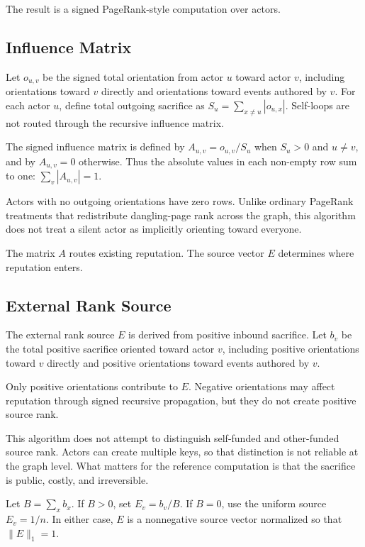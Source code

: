 \documentclass[11pt]{article}
\begin{document}
The result is a signed PageRank-style computation over actors.

\subsection{Influence Matrix}

Let \(o_{u,v}\) be the signed total orientation from actor \(u\) toward actor \(v\), including orientations toward \(v\) directly and orientations toward events authored by \(v\). For each actor \(u\), define total outgoing sacrifice as \(S_u = \sum_{x \ne u} |o_{u,x}|\). Self-loops are not routed through the recursive influence matrix.

The signed influence matrix is defined by \(A_{u,v} = o_{u,v}/S_u\) when \(S_u > 0\) and \(u \ne v\), and by \(A_{u,v}=0\) otherwise. Thus the absolute values in each non-empty row sum to one: \(\sum_v |A_{u,v}| = 1\).

Actors with no outgoing orientations have zero rows. Unlike ordinary PageRank treatments that redistribute dangling-page rank across the graph, this algorithm does not treat a silent actor as implicitly orienting toward everyone.

The matrix \(A\) routes existing reputation. The source vector \(E\) determines where reputation enters.

\subsection{External Rank Source}

The external rank source \(E\) is derived from positive inbound sacrifice. Let \(b_v\) be the total positive sacrifice oriented toward actor \(v\), including positive orientations toward \(v\) directly and positive orientations toward events authored by \(v\).

Only positive orientations contribute to \(E\). Negative orientations may affect reputation through signed recursive propagation, but they do not create positive source rank.

This algorithm does not attempt to distinguish self-funded and other-funded source rank. Actors can create multiple keys, so that distinction is not reliable at the graph level. What matters for the reference computation is that the sacrifice is public, costly, and irreversible.

Let \(B = \sum_x b_x\). If \(B > 0\), set \(E_v = b_v/B\). If \(B = 0\), use the uniform source \(E_v = 1/n\). In either case, \(E\) is a nonnegative source vector normalized so that \(\|E\|_1 = 1\).
\end{document}
